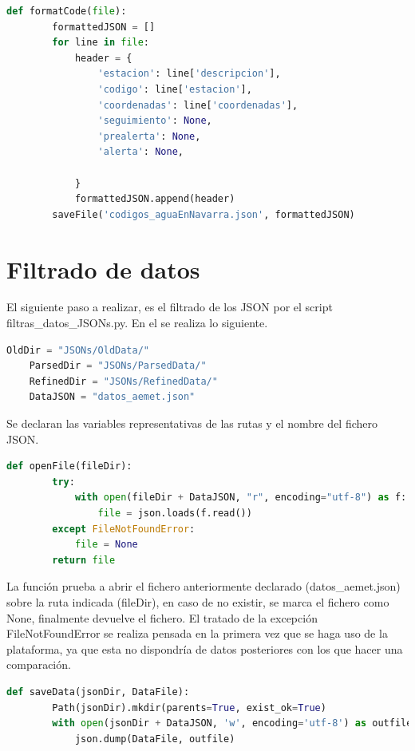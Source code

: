 \begin{lstlisting}[language=Python, caption={Declaración función \textit{formatCode()}}, label=cod:150]
	def formatCode(file):
		formattedJSON = []
		for line in file:
			header = {
				'estacion': line['descripcion'],
				'codigo': line['estacion'],
				'coordenadas': line['coordenadas'],
				'seguimiento': None,
				'prealerta': None,
				'alerta': None,
				
			}
			formattedJSON.append(header)
		saveFile('codigos_aguaEnNavarra.json', formattedJSON)
\end{lstlisting}

\section{Filtrado de datos}
El siguiente paso a realizar, es el filtrado de los JSON por el script filtras\_datos\_JSONs.py. En el se realiza lo siguiente.

\begin{lstlisting}[language=Python, caption={Declaración rutas JSONs y nombre de fichero}]
	OldDir = "JSONs/OldData/"
	ParsedDir = "JSONs/ParsedData/"
	RefinedDir = "JSONs/RefinedData/"
	DataJSON = "datos_aemet.json"
\end{lstlisting}

Se declaran las variables representativas de las rutas y el nombre del fichero JSON.

\begin{lstlisting}[language=Python, caption={Declaración función openFile()}]
	def openFile(fileDir):
		try:
			with open(fileDir + DataJSON, "r", encoding="utf-8") as f:
				file = json.loads(f.read())
		except FileNotFoundError:
			file = None
		return file
\end{lstlisting}

La función prueba a abrir el fichero anteriormente declarado (datos\_aemet.json) sobre la ruta indicada (fileDir), en caso de no existir, se marca el fichero como None, finalmente devuelve el fichero. El tratado de la excepción FileNotFoundError se realiza pensada en la primera vez que se haga uso de la plataforma, ya que esta no dispondría de datos posteriores con los que hacer una comparación.

\begin{lstlisting}[language=Python, caption={Declaración función saveFile()}]
	def saveData(jsonDir, DataFile):
		Path(jsonDir).mkdir(parents=True, exist_ok=True)
		with open(jsonDir + DataJSON, 'w', encoding='utf-8') as outfile:
			json.dump(DataFile, outfile)
\end{lstlisting}


